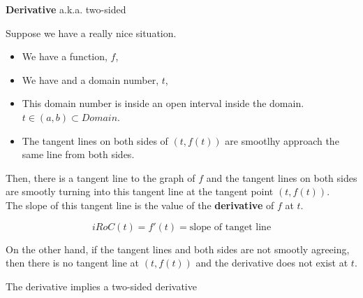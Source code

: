 \documentclass{ximera}
\begin{document}
\begin{definition} \textbf{\textcolor{green!50!black}{Derivative}}  a.k.a. two-sided 


Suppose we have a really nice situation.


\begin{itemize}
\item We have a function, $f$, 
\item We have and a domain number, $t$, 
\item This domain number is inside an open interval inside the domain.  $t \in (a, b) \subset Domain$. 
\item The tangent lines on both sides of $(t, f(t))$ are smootlhy approach the same line from both sides.
\end{itemize}

Then, there is a tangent line to the graph of $f$ and the tangent lines on both sides are smootly turning into this tangent line at the tangent point $(t, f(t))$. \\

The slope of this tangent line is the value of the \textbf{derivative} of $f$ at $t$.

\[
iRoC(t) =f'(t) = \text{slope of tanget line}
\]


On the other hand, if the tangent lines and both sides are not smootly agreeing, then there is no tangent line at $(t, f(t))$ and the derivative does not exist at $t$.   

\end{definition}

The derivative implies a two-sided derivative \\
\end{document}
